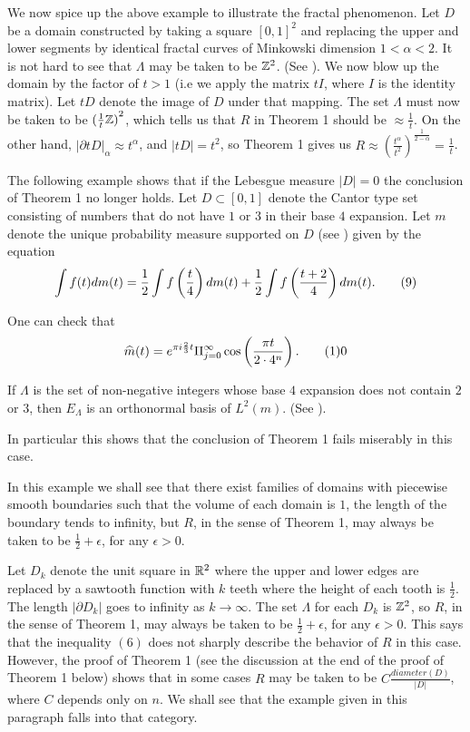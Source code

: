  We now spice up the above example to illustrate the 
fractal phenomenon. Let $D$ be a domain constructed by taking a square 
${[0,1]}^2$ and replacing the upper and lower segments  by identical 
fractal curves of Minkowski dimension $1<\alpha<2$. It is not hard to see
that $\Lambda$ may be taken to be ${\Bbb Z}^2$. (See \cite{Fug}). We
now blow up the domain by the factor of $t>1$ (i.e we apply the matrix $tI$, 
where $I$ is the identity matrix). Let $tD$ denote the image of $D$ under 
that mapping. The set $\Lambda$ must now be taken to be 
${(\frac{1}{t}\Bbb Z)}^2$, which tells us that $R$ in Theorem 1 should be 
$\approx \frac{1}{t}$. On the other hand, ${|\partial tD|}_{\alpha}
\approx t^{\alpha}$, and $|tD|=t^2$, so Theorem 1 gives us 
$R \approx {\left( \frac{t^{\alpha}}{t^2} \right)}^{\frac{1}{2-\alpha}}=
\frac{1}{t}$. \endproclaim 

The following example shows that if the Lebesgue measure $|D|=0$ the 
conclusion of Theorem 1 no longer holds. 
 Let $D \subset [0,1]$ denote the Cantor type set 
consisting of numbers that do not have $1$ or $3$ in their base $4$ 
expansion. Let $m$ denote the unique probability measure supported on $D$ 
(see \cite{Fal}) given by the equation 
$$ \int f(t) dm(t)=\frac{1}{2} \int f\left(\frac{t}{4}\right) dm(t)+
\frac{1}{2} \int f\left(\frac{t+2}{4}\right) dm(t). \tag9$$ 

One can check that
$$ \widehat{m}(t)=e^{\pi i \frac{2}{3}t} \Pi_{j=0}^{\infty} 
\cos\left(\frac{\pi t}{2 \cdot 4^n} \right). \tag10$$ 

If $\Lambda$ is the set of non-negative integers whose 
base $4$ expansion does not contain $2$ or $3$, then $E_{\Lambda}$ is an 
orthonormal basis of $L^2(m)$. (See \cite{JP}).   

In particular this shows that the conclusion of Theorem 1 fails miserably 
in this case.
\endproclaim  

 In this example we shall see that there exist families
of domains with piecewise smooth boundaries such that the volume of each 
domain is $1$, the length of the boundary tends to infinity, but $R$, in 
the sense of Theorem 1, may always be taken to be $\frac{1}{2}+\epsilon$, 
for any $\epsilon>0$. 

Let $D_k$ denote the unit square in ${\Bbb R}^2$ where the upper and lower
edges are replaced by a sawtooth function with $k$ teeth where the height
of each tooth is $\frac{1}{2}$. The length $|\partial D_k|$ goes to 
infinity as $k \rightarrow \infty$. The set $\Lambda$ for each $D_k$ is 
${\Bbb Z}^2$, so $R$, in the sense of Theorem 1, may always be taken to be 
$\frac{1}{2}+\epsilon$, for any $\epsilon>0$. This says that the inequality
$(6)$ does not sharply describe the behavior of $R$ in this case. However, 
the proof of Theorem 1 (see the discussion at the end of the proof of Theorem 
1 below) shows that in some cases $R$ may be taken to be 
$C \frac{diameter(D)}{|D|}$, where $C$ depends only on $n$. We shall see that
the example given in this paragraph falls into that category. 
\endproclaim  

